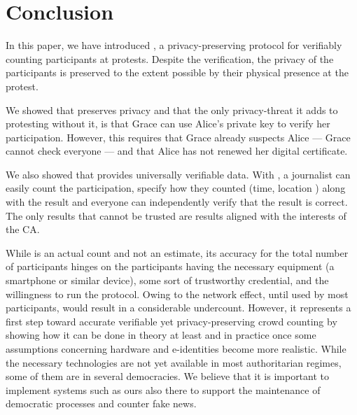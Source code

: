 \section{Conclusion}%
\label{Conclusion}

In this paper, we have introduced \CROCUS, a privacy-preserving protocol for 
verifiably counting participants at protests.
Despite the verification, the privacy of the participants is preserved to the 
extent possible by their physical presence at the protest.

We showed that \CROCUS preserves privacy and that the only privacy-threat it 
adds to protesting without it, is that Grace can use Alice's private key to 
verify her participation.
However, this requires that Grace already suspects Alice --- Grace cannot check 
everyone --- and that Alice has not renewed her digital certificate.

We also showed that \CROCUS provides universally verifiable data.
With \CROCUS, a journalist can easily count the participation, specify how they 
counted (time, location \etc) along with the result and everyone can 
independently verify that the result is correct.
The only results that cannot be trusted are results aligned with the interests 
of the \ac{CA}.


While \CROCUS is an actual count and not an estimate, its accuracy for the 
total number of participants hinges on the participants having the necessary 
equipment (\ie a smartphone or similar device), some sort of trustworthy 
credential, and the willingness to run the protocol. Owing to the network 
effect, until used by most participants, \CROCUS would result in a considerable 
undercount. However, it represents a first step toward accurate verifiable yet 
privacy-preserving crowd counting by showing how it can be done in theory at 
least and in practice once some assumptions concerning hardware and 
e-identities become more realistic. While the necessary technologies are not 
yet available in most authoritarian regimes, some of them are in several 
democracies. We believe that it is important to implement systems such as ours 
also there to support the maintenance of democratic processes and counter fake 
news.

